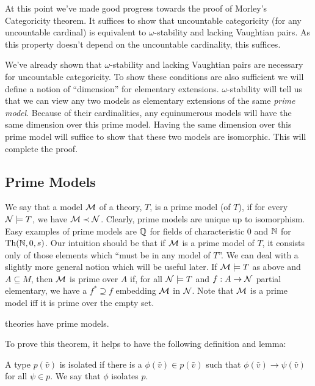 At this point we've made good progress towards the proof of Morley's Categoricity theorem.
It suffices to show that uncountable categoricity (for any uncountable cardinal) is equivalent to \(\omega\)-stability and lacking Vaughtian pairs.
As this property doesn't depend on the uncountable cardinality, this suffices. 

We've already shown that \(\omega\)-stability and lacking Vaughtian pairs are necessary for uncountable categoricity.
To show these conditions are also sufficient we will define a notion of ``dimension'' for elementary extensions.
\(\omega\)-stability will tell us that we can view any two models as elementary extensions of the same \textit{prime model}.
Because of their cardinalities, any equinumerous models will have the same dimension over this prime model.
Having the same dimension over this prime model will suffice to show that these two models are isomorphic.
This will complete the proof. 

\subsection{Prime Models}

\begin{definition}\label{definition_prime_model}
We say that a model \(\mathcal{M}\) of a theory, \(T\), is a prime model (of \(T\)), if for every \(\mathcal{N} \models T\), we have \(\mathcal{M} \prec \mathcal{N}\). 
Clearly, prime models are unique up to isomorphism. 
Easy examples of prime models are \(\mathbb{Q}\) for fields of characteristic 0 and \(\mathbb{N}\) for \(\text{Th}(\mathbb{N}, 0, s)\). 
Our intuition should be that if \(\mathcal{M}\) is a prime model of \(T\), it consists only of those elements which ``must be in any model of \(T\)''.
We can deal with a slightly more general notion which will be useful later. 
If \(\mathcal{M} \models T\) as above and \(A \subseteq M\), then \(\mathcal{M}\) is prime over \(A\) if, for all \(\mathcal{N} \models T\) and \(f:A \to \mathcal{N}\) partial elementary, we have a \(f^* \supseteq f\) embedding \(\mathcal{M}\) in \(\mathcal{N}\). 
Note that \(\mathcal{M}\) is a prime model iff it is prime over the empty set. 
\end{definition}


\begin{theorem}\label{thm_omst_prime}
\omst theories have prime models.
\end{theorem}

To prove this theorem, it helps to have the following definition and lemma:
\begin{definition}\label{definition_isolated_types}
A type \(p(\bar{v})\) is isolated if there is a \(\phi(\bar{v}) \in p(\bar{v})\) such that \(\phi(\bar{v}) \to \psi(\bar{v})\) for all \(\psi \in p\). We say that \(\phi\) isolates \(p\). 
\end{definition}

